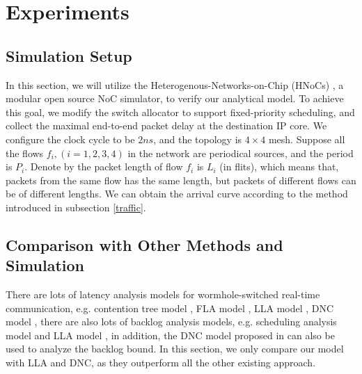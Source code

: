 \documentclass[10pt,journal]{IEEEtran}
\begin{document}
\section{Experiments}\label{experiments}
\subsection{Simulation Setup}
In this section, we will utilize the Heterogenous-Networks-on-Chip (HNoCs) \cite{6404157}, a modular open source NoC simulator, to verify our analytical model. To achieve this goal, we modify the switch allocator to support fixed-priority scheduling, and collect the maximal end-to-end packet delay at the destination IP core. We configure the clock cycle to be $2ns$, and the topology is $4\times 4$ mesh. Suppose all the flows $f_i,(i=1,2,3,4)$ in the network are periodical sources, and the period is $P_i$. Denote by the packet length of flow $f_i$ is $L_i$ (in flits), which means that, packets from the same flow has the same length, but packets of different flows can be of different lengths. We can obtain the arrival curve according to the method introduced in subsection \ref{traffic}.

\subsection{Comparison with Other Methods and Simulation}
There are lots of latency analysis models for wormhole-switched real-time communication, e.g. contention tree model \cite{LuJS05}, FLA model \cite{Shi:2008:RCA:1397757.1397996}, LLA model \cite{73}, DNC model \cite{Qian489900}, there are also lots of backlog analysis models, e.g. scheduling analysis model \cite{Manolache:2006:BSO:1131481.1131683} and LLA model \cite{189}, in addition, the DNC model proposed in \cite{Qian489900} can also be used to analyze the backlog bound. In this section, we only compare our model with LLA and DNC, as they outperform all the other existing approach.
\end{document}
